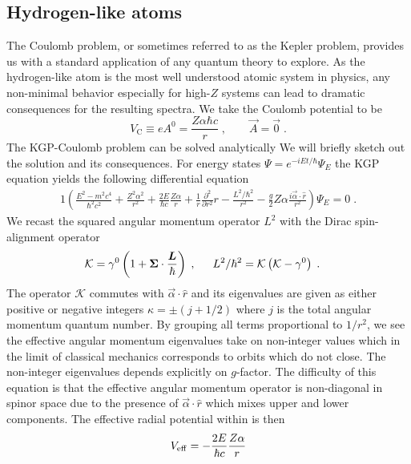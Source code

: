 \subsection{Hydrogen-like atoms}
\label{sec:coulomb}
The Coulomb problem, or sometimes referred to as the Kepler problem, provides us with a standard application of any quantum theory to explore. As the hydrogen-like atom is the most well understood atomic system in physics, any non-minimal behavior especially for high-$Z$ systems can lead to dramatic consequences for the resulting spectra. We take the Coulomb potential to be
\begin{equation}
	\label{eq:coulomb:01} V_\mathrm{C}\equiv e A^{0}=\frac{Z \alpha\hbar c}{r}\;,\qquad \vec{A}=\vec{0}\;.
\end{equation}
The KGP-Coulomb problem can be solved analytically \ar We will briefly sketch out the solution and its consequences. For energy states $\Psi=e^{-iEt/\hbar}\Psi_{E}$ the KGP equation yields the following differential equation
\begin{alignat}{1}
	\label{cou02} \left(\frac{E^{2}-m^{2}c^{4}}{\hbar^{2}c^{2}}+\frac{Z^{2}\alpha^{2}}{r^{2}}+\frac{2E}{\hbar c}\frac{Z\alpha}{r}+\frac{1}{r}\frac{\partial^{2}}{\partial r^{2}}r-\frac{L^{2}/\hbar^{2}}{r^{2}}-\frac{g}{2}Z\alpha\frac{i\vec{\alpha}\cdot\hat{r}}{r^{2}}\right)\Psi_{E}=0\;.
\end{alignat}
We recast the squared angular momentum operator $L^{2}$ with the Dirac spin-alignment operator
\begin{alignat}{1}
\label{cou04} &\mathcal{K}=\gamma^{0}\left(1+\bb{\Sigma}\cdot\frac{\bb{L}}{\hbar}\right)\;,\indent L^{2}/\hbar^{2}=\mathcal{K}\left(\mathcal{K}-\gamma^{0}\right)\;.
\end{alignat}
The operator $\mathcal{K}$ commutes with $\vec{\alpha}\cdot\hat{r}$ and its eigenvalues are given as either positive or negative integers $\kappa=\pm(j+1/2)$ where $j$ is the total angular momentum quantum number. By grouping all terms proportional to $1/r^{2}$, we see the effective angular momentum eigenvalues take on non-integer values which in the limit of classical mechanics corresponds to orbits which do not close. \ar The non-integer eigenvalues depends explicitly on $g$-factor. The difficulty of this equation is that the effective angular momentum operator is non-diagonal in spinor space due to the presence of $\vec{\alpha}\cdot\hat{r}$ which mixes upper and lower components. The effective radial potential within  is then
\begin{alignat}{1}
	\label{temp} V_{\rm eff}=-\frac{2E}{\hbar c}\frac{Z\alpha}{r}
\end{alignat}
